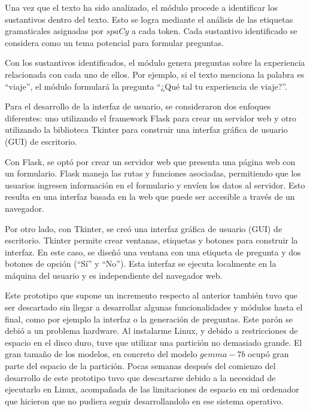 Una vez que el texto ha sido analizado, el módulo procede a identificar los sustantivos dentro del texto. Esto se logra mediante el análisis de las etiquetas gramaticales asignadas por $spaCy$ a cada token. Cada sustantivo identificado se considera como un tema potencial para formular preguntas.

Con los sustantivos identificados, el módulo genera preguntas sobre la experiencia relacionada con cada uno de ellos. Por ejemplo, si el texto menciona la palabra es ``viaje'', el módulo formulará la pregunta ``¿Qué tal tu experiencia de viaje?''.

Para el desarrollo de la interfaz de usuario, se consideraron dos enfoques diferentes: uno utilizando el framework Flask para crear un servidor web y otro utilizando la biblioteca Tkinter para construir una interfaz gráfica de usuario (GUI) de escritorio.

Con Flask, se optó por crear un servidor web que presenta una página web con un formulario. Flask maneja las rutas y funciones asociadas, permitiendo que los usuarios ingresen información en el formulario y envíen los datos al servidor. Esto resulta en una interfaz basada en la web que puede ser accesible a través de un navegador.

Por otro lado, con Tkinter, se creó una interfaz gráfica de usuario (GUI) de escritorio. Tkinter permite crear ventanas, etiquetas y botones para construir la interfaz. En este caso, se diseñó una ventana con una etiqueta de pregunta y dos botones de opción (``Sí'' y ``No''). Esta interfaz se ejecuta localmente en la máquina del usuario y es independiente del navegador web.

Este prototipo que supone un incremento respecto al anterior también tuvo que ser descartado sin llegar a desarrollar algunas funcionalidades y módulos hasta el final, como por ejemplo la interfaz o la generación de preguntas. Este parón se debió a un problema hardware. Al instalarme Linux, y debido a restricciones de espacio en el disco duro, tuve que utilizar una partición no demasiado grande. El gran tamaño de los modelos, en concreto del modelo $gemma-7b$ ocupó gran parte del espacio de la partición. Pocas semanas después del comienzo del desarrollo de este prototipo tuvo que descartarse debido a la necesidad de ejecutarlo en Linux, acompañada de las limitaciones de espacio en mi ordenador que hicieron que no pudiera seguir desarrollandolo en ese sistema operativo. 

